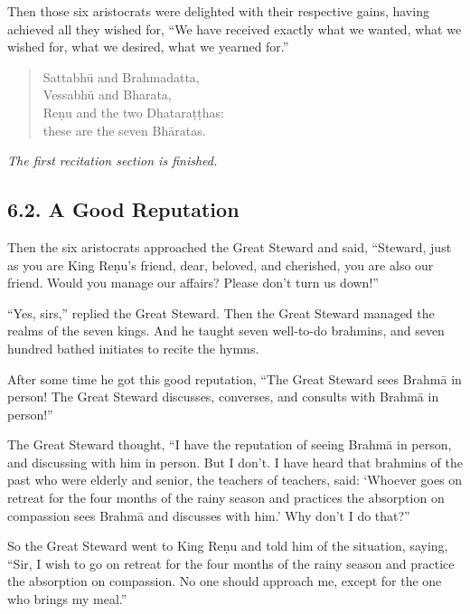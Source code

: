 \documentclass[12pt,openany]{book}%
\newcommand*{\scendsection}[1]{\begin{center}\textit{#1}\end{center}}
\begin{document}
Then those six aristocrats were delighted with their respective gains, having achieved all they wished for, “We have received exactly what we wanted, what we wished for, what we desired, what we yearned for.” 

\begin{verse}%
\textsanskrit{Sattabhū} and Brahmadatta, \\
\textsanskrit{Vessabhū} and Bharata, \\
\textsanskrit{Reṇu} and the two \textsanskrit{Dhataraṭṭhas}: \\
these are the seven \textsanskrit{Bhāratas}. 

%
\end{verse}

\scendsection{The first recitation section is finished. }

\subsection*{6.2. A Good Reputation }

Then the six aristocrats approached the Great Steward and said, “Steward, just as you are King \textsanskrit{Reṇu}’s friend, dear, beloved, and cherished, you are also our friend. Would you manage our affairs? Please don’t turn us down!” 

“Yes, sirs,” replied the Great Steward. Then the Great Steward managed the realms of the seven kings. And he taught seven well-to-do brahmins, and seven hundred bathed initiates to recite the hymns. 

After some time he got this good reputation, “The Great Steward sees \textsanskrit{Brahmā} in person! The Great Steward discusses, converses, and consults with \textsanskrit{Brahmā} in person!” 

The Great Steward thought, “I have the reputation of seeing \textsanskrit{Brahmā} in person, and discussing with him in person. But I don’t. I have heard that brahmins of the past who were elderly and senior, the teachers of teachers, said: ‘Whoever goes on retreat for the four months of the rainy season and practices the absorption on compassion sees \textsanskrit{Brahmā} and discusses with him.’ Why don’t I do that?” 

So the Great Steward went to King \textsanskrit{Reṇu} and told him of the situation, saying, “Sir, I wish to go on retreat for the four months of the rainy season and practice the absorption on compassion. No one should approach me, except for the one who brings my meal.” 
\end{document}

